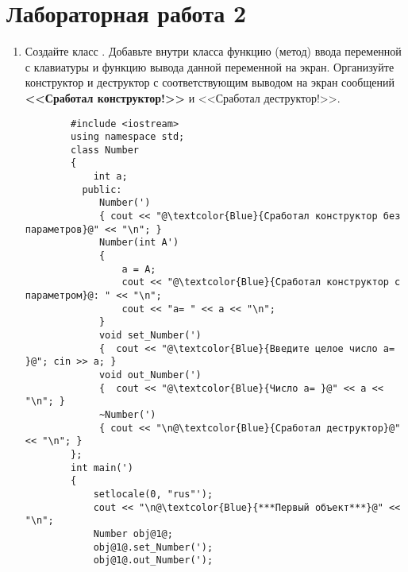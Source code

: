 \section{Лабораторная работа 2}
\begin{enumerate}[leftmargin=*]
    \item Создайте класс . Добавьте внутри класса функцию (метод) ввода переменной с клавиатуры и функцию вывода данной переменной на экран. Организуйте конструктор и деструктор с соответствующим выводом на экран сообщений \textbf{<<Сработал конструктор!>>} и <<Сработал деструктор!>>.
    \begin{lstlisting}
        #include <iostream>
        using namespace std;
        class Number
        {
            int a;
          public:
             Number(')
             { cout << "@\textcolor{Blue}{Сработал конструктор без параметров}@" << "\n"; }
             Number(int A')
             {
                 a = A;
                 cout << "@\textcolor{Blue}{Сработал конструктор с параметром}@: " << "\n";
                 cout << "a= " << a << "\n";
             }
             void set_Number(')
             {  cout << "@\textcolor{Blue}{Введите целое число a= }@"; cin >> a; }
             void out_Number(')
             {  cout << "@\textcolor{Blue}{Число a= }@" << a << "\n"; }
             ~Number(')
             { cout << "\n@\textcolor{Blue}{Сработал деструктор}@" << "\n"; }
        };
        int main(')
        {
            setlocale(0, "rus"');
            cout << "\n@\textcolor{Blue}{***Первый объект***}@" << "\n";
            Number obj@1@;
            obj@1@.set_Number(');
            obj@1@.out_Number(');


\end{lstlisting}
\end{enumerate}
